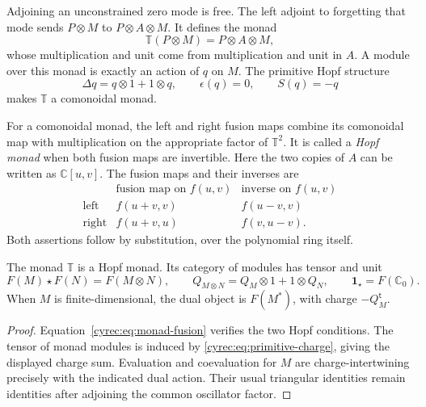 Adjoining an unconstrained zero mode is free. The left adjoint to
forgetting that mode sends $P\otimes M$ to
$P\otimes A\otimes M$. It defines the monad
\[
 \mathbb T(P\otimes M)=P\otimes A\otimes M,
\]
whose multiplication and unit come from multiplication and unit in
$A$. A module over this monad is exactly an action of $q$ on $M$.
The primitive Hopf structure
\begin{equation}\label{cyrec:eq:primitive-charge}
 \Delta q=q\otimes1+1\otimes q,
 \qquad\epsilon(q)=0,
 \qquad S(q)=-q
\end{equation}
makes $\mathbb T$ a comonoidal monad.

For a comonoidal monad, the left and right fusion maps combine its
comonoidal map with multiplication on the appropriate factor of
$\mathbb T^2$. It is called a \emph{Hopf monad} when both fusion
maps are invertible.
Here the two copies of $A$ can be written as $\mathbb C[u,v]$.
The fusion maps and their inverses are
\begin{equation}\label{cyrec:eq:monad-fusion}
\begin{array}{c|c|c}
 &\text{fusion map on }f(u,v)&\text{inverse on }f(u,v)\\ \hline
 \text{left}&f(u+v,v)&f(u-v,v)\\
 \text{right}&f(u+v,u)&f(v,u-v).
\end{array}
\end{equation}
Both assertions follow by substitution, over the polynomial ring
itself.

\begin{proposition}\label{cyrec:prop:monad}
The monad $\mathbb T$ is a Hopf monad. Its category of modules
has tensor and unit
\begin{equation}\label{cyrec:eq:charge-tensor}
 F(M)\star F(N)=F(M\otimes N),
 \qquad Q_{M\otimes N}=Q_M\otimes1+1\otimes Q_N,
 \qquad\mathbf1_\star=F(\mathbb C_0).
\end{equation}
When $M$ is finite-dimensional, the dual object is $F(M^*)$,
with charge $-Q_M^{\mathsf t}$.
\end{proposition}

\begin{proof}
Equation~\eqref{cyrec:eq:monad-fusion} verifies the two Hopf
conditions. The tensor of monad modules is induced by
\eqref{cyrec:eq:primitive-charge}, giving the displayed charge sum.
Evaluation and coevaluation for $M$ are charge-intertwining precisely
with the indicated dual action. Their usual triangular identities
remain identities after adjoining the common oscillator factor.
\end{proof}

